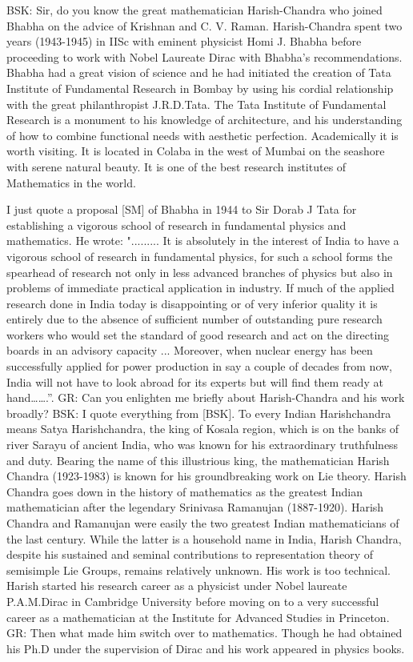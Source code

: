 BSK: Sir, do you know the great mathematician Harish-Chandra who joined Bhabha on the advice of Krishnan and C. V. Raman. Harish-Chandra spent two years (1943-1945) in IISc with eminent physicist Homi J. Bhabha before proceeding to work with Nobel Laureate Dirac with Bhabha’s recommendations.  Bhabha had a great vision of science and he had initiated the creation of Tata Institute of Fundamental Research in Bombay by using his cordial relationship with the great philanthropist J.R.D.Tata.  The Tata Institute of Fundamental Research is a monument to his knowledge of architecture, and his understanding of how to combine functional needs with aesthetic perfection. Academically it is worth visiting. It is located in Colaba in the west of Mumbai on the seashore with serene natural beauty. It is one of the best research institutes of Mathematics in the world.

I just quote a proposal [SM] of Bhabha in 1944 to Sir Dorab J Tata for establishing a vigorous school of research in fundamental physics and mathematics.  He wrote:  "......... It is absolutely in the interest of India to have a vigorous school of research in fundamental physics, for such a school forms the spearhead of research not only in less advanced branches of physics but also in problems of immediate practical application in industry. If much of the applied research done in India today is disappointing or of very inferior quality it is entirely due to the absence of sufficient number of outstanding pure research workers who would set the standard of good research and act on the directing boards in an advisory capacity ... Moreover, when nuclear energy has been successfully applied for power production in say a couple of decades from now, India will not have to look abroad for its experts but will find them ready at hand…….”.
GR: Can you enlighten me briefly about Harish-Chandra and his work broadly? 
BSK: I quote everything from [BSK]. To every Indian Harishchandra means Satya Harishchandra, the king of Kosala region, which is on the banks of river Sarayu of ancient India, who was known for his extraordinary truthfulness and duty. Bearing the name of this illustrious king, the mathematician Harish Chandra (1923-1983) is known for his groundbreaking work on Lie theory. Harish Chandra goes down in the history of mathematics as the greatest Indian mathematician after the legendary Srinivasa Ramanujan (1887-1920). Harish Chandra and Ramanujan were easily the two greatest Indian mathematicians of the last century. While the latter is a household name in India, Harish Chandra, despite his sustained and seminal contributions to representation theory of semisimple Lie Groups, remains relatively unknown. His work is too technical. Harish started his research career as a physicist under Nobel laureate P.A.M.Dirac in Cambridge University before moving on to a very                                           successful career as a mathematician at the Institute for Advanced Studies in Princeton. 
   GR: Then what made him switch over to mathematics. Though he had obtained his Ph.D under the supervision of Dirac and his work appeared in physics books.

